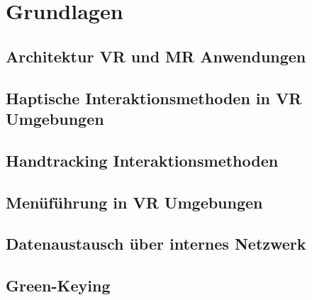\section{Grundlagen}
\subsection{Architektur VR und MR Anwendungen}\label{sec:ArchitekturAnwendungen}
\subsection{Haptische Interaktionsmethoden in VR Umgebungen}\label{sec:HaptikAnwendungen}
\subsection{Handtracking Interaktionsmethoden}\label{sec:HandtrackingAnwendungen}
\subsection{Menüführung in VR Umgebungen}\label{sec:MenüAnwendungen}
\subsection{Datenaustausch über internes Netzwerk}\label{sec:Netzwerk}
\subsection{Green-Keying}\label{sec:Green-Keying}
